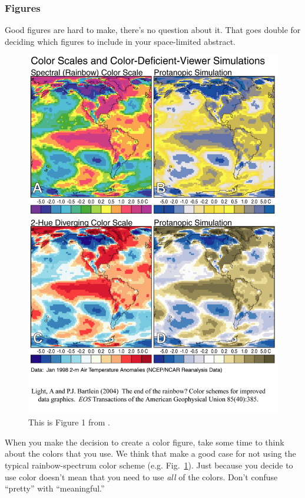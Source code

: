 \documentclass[twoside]{article}
\begin{document}
\subsubsection*{Figures}

Good figures are hard to make, there's no question about it.  That
goes double for deciding which figures to include in your 
space-limited abstract.

\begin{figure}
\begin{center}
\includegraphics[width=\columnwidth]{lb_fig1.png}
\caption[Color Scales and Color-Deficient-Viewer Simulations]{
    \label{color_scales}
    This is Figure 1 from \citet{2004EOSTr..85..385L}.  
    }
\end{center}
\end{figure}

When you make the decision to create a color figure, take some time
to think about the colors that you use.  We think that
\citet{2004EOSTr..85..385L} make a good case for not using the
typical rainbow-spectrum color scheme (e.g. Fig.~\ref{color_scales}).
Just because you decide to use color doesn't mean that you need to
use \emph{all} of the colors.  Don't confuse ``pretty'' with
``meaningful.''
\end{document}

